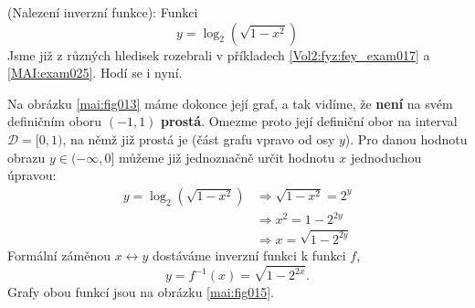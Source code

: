 \begin{mdframed}[style=mdexam]
  \begin{example}\label{MAI:exam027}
    (Nalezení inverzní funkce): Funkci 
    \begin{equation*}
      y = \log_2(\sqrt{1-x^2})
    \end{equation*}
    Jsme již z různých hledisek rozebrali v příkladech \ref{Vol2:fyz:fey_exam017} a
    \ref{MAI:exam025}. Hodí se i nyní.

    {\centering
    \captionsetup{type=figure}
    \par}
    
    Na obrázku \ref{mai:fig013} máme dokonce její graf, a tak vidíme, že \textbf{není} na svém 
    definičním oboru \((-1, 1)\) \textbf{prostá}. Omezme proto její definiční obor na interval 
    \(\mathcal{D} = [0, 1)\), na němž již prostá je (část grafu vpravo od osy \(y\)). Pro danou 
    hodnotu obrazu \(y \in (-\infty,0]\) můžeme již jednoznačně určit hodnotu \(x\) jednoduchou 
    úpravou:
    \begin{align*}
      y = \log_2(\sqrt{1-x^2}) &\Rightarrow \sqrt{1-x^2} = 2^y   \\
                               &\Rightarrow x^2 = 1 - 2^{2y}     \\
                               &\Rightarrow x = \sqrt{1 - 2^{2y}}
    \end{align*}
    Formální záměnou \(x \leftrightarrow y\) dostáváme inverzní funkci k funkci \(f\),
    \begin{equation*}
      y =f^{-1}(x) = \sqrt{1 - 2^{2x}}.
    \end{equation*}
    Grafy obou funkcí jsou na obrázku \ref{mai:fig015}.
  \end{example}
\end{mdframed}